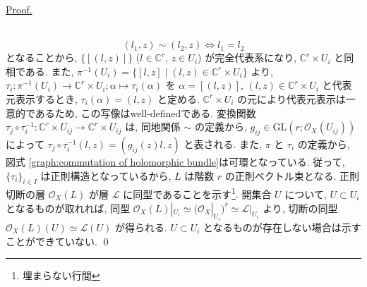 \documentclass[a4paper,10pt,dvipdfmx]{jsreport}
\renewenvironment{proof}{\begin{flushleft} \underline{Proof.} \end{flushleft}\vspace{-1zh}\ }{\qed\\}
\theoremstyle{definition}
\begin{document}
\begin{proof}
    \[
        (l_1,z) \sim (l_2,z) \iff l_1 = l_2
    \]
    となることから, \(\{[(l,z)]\}\) (\(l \in \mathbb{C}^r\), \(z\in U_i\)) が完全代表系になり, \(\mathbb{C}^r \times U_i\) と同相である. また, \(\pi^{-1}(U_i) = \{[l,z] \mid (l,z) \in \mathbb{C}^r \times U_i\}\) より, \(\tau_i \colon \pi^{-1}(U_i) \to \mathbb{C}^r \times U_i;\alpha \mapsto \tau_i(\alpha)\) を \(\alpha = [(l,z)]\), \((l,z) \in \mathbb{C}^r \times U_i\) と代表元表示するとき, \(\tau_i(\alpha) = (l,z)\) と定める. \(\mathbb{C}^r \times U_i\) の元により代表元表示は一意的であるため, この写像はwell-definedである. 変換関数 \(\tau_j \circ \tau_i^{-1} \colon \mathbb{C}^r \times U_{ij} \to \mathbb{C}^r \times U_{ij}\) は, 同地関係 \(\sim\) の定義から, \(g_{ij} \in \textrm{GL}(r;\mathcal{O}_X(U_{ij}))\) によって \(\tau_j \circ \tau_i^{-1} (l,z) = (g_{ij}(z)l,z)\) と表される. また, \(\pi\) と \(\tau_i\) の定義から, 図式 \ref{graph:commutation of holomorphic bundle}は可環となっている. 従って, \(\{\tau_i\}_{i\in I}\) は正則構造となっているから, \(L\) は階数 \(r\) の正則ベクトル束となる. 正則切断の層 \(\mathcal{O}_X(L)\) が層 \(\mathcal{L}\) に同型であることを示す\footnote{埋まらない行間}. 開集合 \(U\) について, \(U\subset U_i\) となるものが取れれば, 同型 \(\mathcal{O}_X(L)|_{U_i} \simeq (\mathcal{O}_X|_{U_i})^r \simeq \mathcal{L}|_{U_i}\) より, 切断の同型 \(\mathcal{O}_X(L)(U) \simeq \mathcal{L}(U)\) が得られる. \(U\subset U_i\) となるものが存在しない場合は示すことができていない.
\end{proof}
\end{document}
